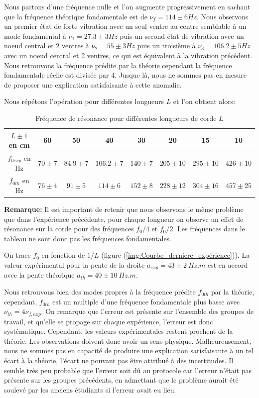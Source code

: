 \documentclass[11pt]{article}
\begin{document}
Nous partons d'une fréquence nulle et l'on augmente progressivement en sachant que la fréquence théorique fondamentale est de $\nu_f = 114 \pm 6 Hz$.
Nous observons un premier état de forte vibration avec un seul ventre au centre semblable à un mode fondamental à $\nu_1 = 27.3 \pm 3 Hz$ puis un second état 
de vibration avec un noeud central et 2 ventres à $\nu_2 = 55 \pm 3 Hz$ puis un troisième à $\nu_3 = 106.2 \pm 5Hz$ avec un noeud central et 2 ventres, ce qui est équivalent à la vibration
précédent. Nous retrouvons la fréquence prédite par la théorie cependant la fréquence fondamentale réelle est divisée par 4. Jusque là, nous ne sommes pas en mesure de proposer une explication
satisfaisante à cette anomalie.

Nous répétons l'opération pour différentes longueurs $L$ et l'on obtient alors:

\begin{table}[h!]
	\centering
	\begin{tabular}{||c c c c c c c c||} 
		\hline
		$L \pm 1$ en cm & 60 & 50 & 40 & 30 & 20 & 15 & 10 \\
		\hline
        $f_{0exp}$ en Hz & $70 \pm 7$ & $84.9 \pm 7$ & $106.2 \pm 7$ & $140 \pm 7$ & $205 \pm 10$ & $295 \pm 10$ & $426 \pm 10$ \\
        $f_{0th}$ en Hz & $76 \pm 4$ & $91 \pm 5$ & $114 \pm 6$ & $152 \pm 8$ & $228 \pm 12$ & $304 \pm 16$ & $457 \pm 25$ \\
		\hline
	\end{tabular}
	\caption{Fréquence de résonance pour différentes longueurs de corde $L$}
	\label{table:2}
\end{table}

\textbf{Remarque:} Il est important de retenir que nous observons le même problème que dans l'expérience précédente, pour chaque longueur on observe un effet de résonance sur la corde
pour des fréquences $f_0/4$ et $f_0 / 2$. Les fréquences dans le tableau ne sont donc pas les fréquences fondamentales.

On trace $f_0$ en fonction de $1/L$ (figure (\ref{img:Courbe_derniere_expérience})). 
La valeur expérimental pour la pente de la droite $a_{exp}=43 \pm 2 \ Hz.m$ est en accord avec la pente théorique $a_{th}=40 \pm 10 \ Hz.m$.

Nous retrouvons bien des modes propres à la fréquence prédite $f_{0th}$ par la théorie, cependant, $f_{0th}$ est un multiple d'une fréquence fondamentale plus basse avec $\nu_{th} = 4 \nu_{f,exp}$.
On remarque que l'erreur est présente sur l'ensemble des groupes de travail, et qu'elle se propage sur chaque expérience, l'erreur est donc systématique. Cependant, les valeurs expérimentales restent prochent
de la théorie. Les observations doivent donc avoir un sens physique.
Malheureusement, nous ne sommes pas en capacité de produire une explication satisfaisante à un tel écart à la théorie, l'écart ne pouvant pas être attribué à des incertitudes. Il semble très peu probable
que l'erreur soit dû au protocole car l'erreur n'était pas présente sur les groupes précédents, en admettant que le problème aurait été soulevé par les anciens étudiants si l'erreur avait eu lieu.
\end{document}
